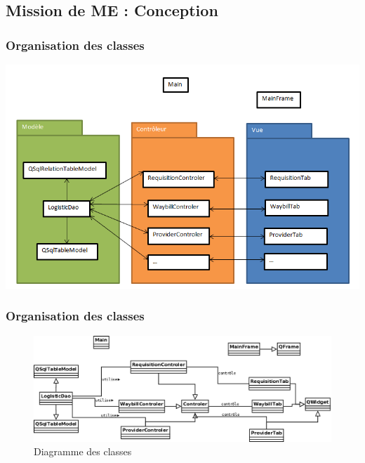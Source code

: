 \subsection{Mission de ME : Conception}
	\begin{frame}
		\frametitle{Organisation des classes}
		\begin{center}
			\includegraphics[scale=0.45]{Images/OrganisationClasses}
		\end{center}
	\end{frame}
	\begin{frame}
		\frametitle{Organisation des classes}
		\begin{figure}[htbp]
			\centering
			\includegraphics[scale=0.2]{Images/DiagrammeClasses}
			\caption{Diagramme des classes}
		\end{figure}
	\end{frame}
